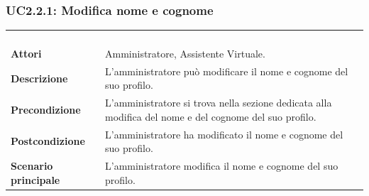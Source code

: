 \subsubsection{UC2.2.1: Modifica nome e cognome}
\label{UC2.2.1}
\begin{longtable}{l|p{10cm}}
\rowcolor[gray]{0.8} \multicolumn{2}{c}{} \\
\rowcolor[gray]{0.8} \multicolumn{2}{c}{\textbf{UC2.2.1 - Modifica nome e cognome}} \\
\rowcolor[gray]{0.8} \multicolumn{2}{c}{} \\
\hline
&\\
\textbf{Attori} & Amministratore, Assistente Virtuale.\\[7pt]
\textbf{Descrizione} & L'amministratore può modificare il nome e cognome del suo profilo.\\[7pt]
\textbf{Precondizione} & L'amministratore si trova nella sezione dedicata alla modifica del nome e del cognome del suo profilo.\\[7pt]
\textbf{Postcondizione} & L'amministratore ha modificato il nome e cognome del suo profilo.\\[7pt]
\textbf{Scenario principale} &L'amministratore modifica il nome e cognome del suo profilo.\\[7pt]\hline
\end{longtable}

